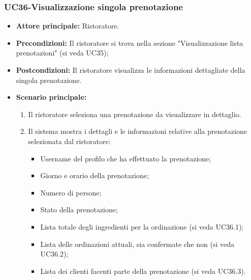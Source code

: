 \subsubsection{UC36-Visualizzazione singola prenotazione}
\begin{itemize}
    \item \textbf{Attore principale:} Ristoratore.
    \item \textbf{Precondizioni:} Il ristoratore si trova nella sezione "Visualizzazione lista prenotazioni" (si veda UC35);
    \item \textbf{Postcondizioni:} Il ristoratore visualizza le informazioni dettagliate della singola prenotazione.
    \item \textbf{Scenario principale:}
    \begin{enumerate}
        \item Il ristoratore seleziona una prenotazione da visualizzare in dettaglio.
        \item Il sistema mostra i dettagli e le informazioni relative alla prenotazione selezionata dal ristoratore:
        \begin{itemize}
            \item Username del profilo che ha effettuato la prenotazione;
            \item Giorno e orario della prenotazione;
            \item Numero di persone;
            \item Stato della prenotazione;
            \item Lista totale degli ingredienti per la ordinazione (si veda UC36.1);
            \item Lista delle ordinazioni attuali, sia confermate che non (si veda UC36.2);
            \item Lista dei clienti facenti parte della prenotazione (si veda UC36.3).
        \end{itemize}
    \end{enumerate}
\end{itemize}

